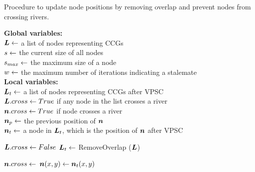 \begin{algorithm}[tb!]
    \caption{Procedure to update node positions by removing overlap and prevent nodes from crossing rivers.}\label{alg:UpdateNodePosition}
    \textbf{Global variables:} \\
    $ \bm{L} \gets $ a list of nodes representing CCGs \\
    $ s \gets $ the current size of all nodes \\
    $ s_{max} \gets $ the maximum size of a node \\
    $ w \gets $ the maximum number of iterations indicating a stalemate \\

    \textbf{Local variables:} \\
    $ \bm{L}_t \gets $ a list of nodes representing CCGs after VPSC \\
    $ \bm{L}.cross \gets True $ if any node in the list crosses a river \\
    $ \bm{n}.cross \gets True $ if node crosses a river \\
    $ \bm{n}_{p} \gets $ the previous position of $ \bm{n} $\\
    $ \bm{n}_t \gets $ a node in $ \bm{L}_t $, which is the position of $ \bm{n} $ after VPSC \\

    \begin{algorithmic}[1]
        \While{$ \nodeSize < \nodeSizeMax $}


                \State {}
                \State $ \bm{L}.cross \gets False $
                \State $ \bm{L}_t \gets $ RemoveOverlap ($ \bm{L} $)

                \ForEach {$ \nodeListVPSCEach \in \nodeListVPSC $}


                        \State $ \bm{n}.cross \gets $ 
                        \State $ \bm{n}(x,y) \gets \bm{n}_t(x,y) $



\end{algorithmic}
\end{algorithm}
